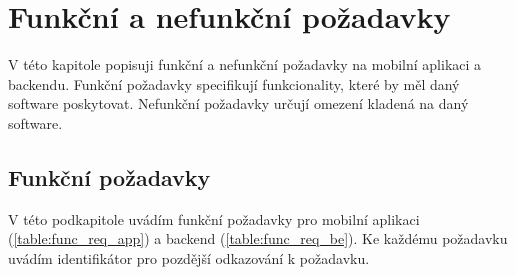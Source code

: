 \chapter{Funkční a nefunkční požadavky}

\setcounter{page}{1}

\begin{chapterabstract}
	V této kapitole popisuji funkční a nefunkční požadavky na mobilní aplikaci a backendu. Funkční požadavky specifikují funkcionality, které by měl daný software poskytovat. Nefunkční požadavky určují omezení kladená na daný software.
\end{chapterabstract}

\section{Funkční požadavky}
V této podkapitole uvádím funkční požadavky pro mobilní aplikaci (\ref{table:func_req_app}) a backend (\ref{table:func_req_be}). Ke každému požadavku uvádím identifikátor pro pozdější odkazování k požadavku.

